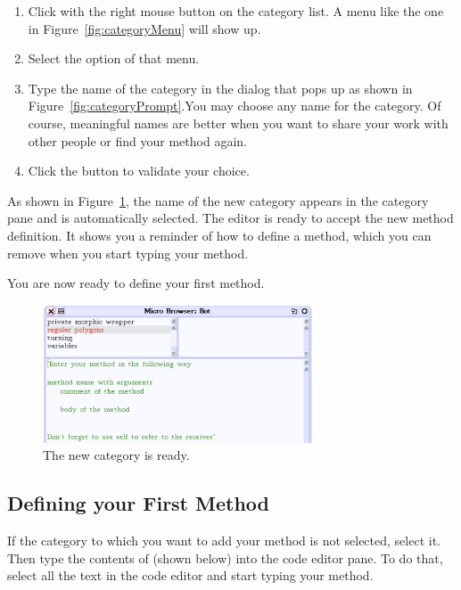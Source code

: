 \begin{enumerate}

\item Click with the right mouse button on the category list.
A menu like the one in Figure~\ref{fig:categoryMenu} will show up.

\item Select the option  of that menu.

\item Type the name of the category in the dialog that pops up 
as shown in Figure~\ref{fig:categoryPrompt}.You may choose any name for the category. Of course, meaningful names are better when you want to share your work with other people or find your method again. 

\item Click the  button to validate your  choice.
\end{enumerate}



As shown in Figure~\ref{fig:categorycreated}, the name of the
new category appears in the category pane and is automatically
selected. The editor is ready to accept the new method definition. It shows 
you a reminder of how to define a method, which you can remove when you start 
typing your method. 

You are now ready to define your first method.
\begin{figure}[h]
\centerline{\includegraphics[width=8cm]{tbFour}}
\caption{The new category is ready.\label{fig:categorycreated}}
\end{figure}


\subsection{Defining your First Method}\label{sec:definingmethod}
If the category to which you want to add your method is not selected,
select it. Then type the contents of 
(shown below) into the code editor pane. To do that, select 
all the text in the code editor and start typing your method. 

